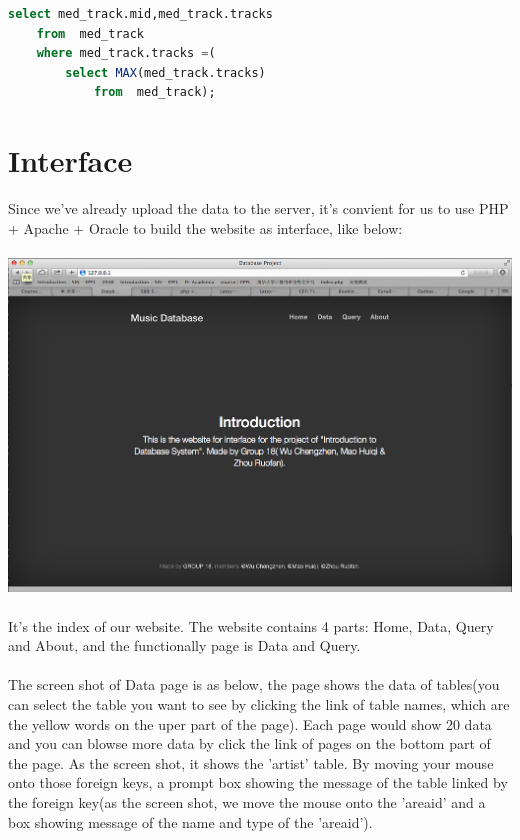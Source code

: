 \documentclass[11pt]{article} %
\begin{document}
{\begin{lstlisting}[language=SQL, keywordstyle=\color{blue!70},
commentstyle=\color{red!50!green!50!blue!50},
rulesepcolor=\color{red!20!green!20!blue!20},
frame=shadowbox]
select med_track.mid,med_track.tracks
	from  med_track 
	where med_track.tracks =(
  		select MAX(med_track.tracks)
  			from  med_track);
\end{lstlisting}


\section{Interface}
Since we've already upload the data to the server, it's convient for us to use PHP + Apache + Oracle to build the website as interface, like below:\\ \\
\includegraphics[width=14cm]{interface1}\\ \\
It's the index of our website. The website contains 4 parts: Home, Data, Query and About, and the functionally page is Data and Query.\\ \\
The screen shot of Data page is as below, the page shows the data of tables(you can select the table you want to see by clicking the link of table names, which are the yellow words on the uper part of the page). Each page would show 20 data and you can blowse more data by click the link of pages on the bottom part of the page. As the screen shot, it shows the 'artist' table. By moving your mouse onto those foreign keys, a prompt box showing the message of the table linked by the foreign key(as the screen shot, we move the mouse onto the 'areaid' and a box showing message of the name and type of the 'areaid').\\ \\
}
\end{document}
